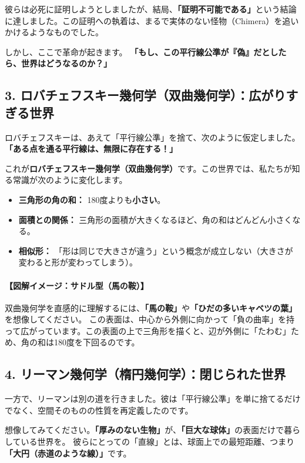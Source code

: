 \documentclass[a4paper,11pt,openany]{ltjsbook}
\begin{document}
\begin{lecturebox}
彼らは必死に証明しようとしましたが、結局、\textbf{「証明不可能である」}という結論に達しました。この証明への執着は、まるで実体のない怪物（Chimera）を追いかけるようなものでした。

しかし、ここで革命が起きます。
\textbf{「もし、この平行線公準が『偽』だとしたら、世界はどうなるのか？」}

\subsection*{3. ロバチェフスキー幾何学（双曲幾何学）：広がりすぎる世界}

ロバチェフスキーは、あえて「平行線公準」を捨て、次のように仮定しました。
\textbf{「ある点を通る平行線は、無限に存在する！」}

これが\textbf{ロバチェフスキー幾何学（双曲幾何学）}です。この世界では、私たちが知る常識が次のように変化します。

\begin{itemize}[leftmargin=2em]
\item \textbf{三角形の角の和：} 180度よりも\textbf{小さい}。
\item \textbf{面積との関係：} 三角形の面積が大きくなるほど、角の和はどんどん小さくなる。
\item \textbf{相似形：} 「形は同じで大きさが違う」という概念が成立しない（大きさが変わると形が変わってしまう）。
\end{itemize}

\paragraph{【図解イメージ：サドル型（馬の鞍）】}
双曲幾何学を直感的に理解するには、\textbf{「馬の鞍」}や\textbf{「ひだの多いキャベツの葉」}を想像してください。
この表面は、中心から外側に向かって「負の曲率」を持って広がっています。この表面の上で三角形を描くと、辺が外側に「たわむ」ため、角の和は180度を下回るのです。

\subsection*{4. リーマン幾何学（楕円幾何学）：閉じられた世界}

一方で、リーマンは別の道を行きました。彼は「平行線公準」を単に捨てるだけでなく、空間そのものの性質を再定義したのです。

想像してみてください。\textbf{「厚みのない生物」}が、\textbf{「巨大な球体」}の表面だけで暮らしている世界を。
彼らにとっての「直線」とは、球面上での最短距離、つまり\textbf{「大円（赤道のような線）」}です。


\end{lecturebox}
\end{document}
